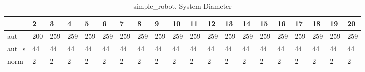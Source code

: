 \begin{table}
\centering
\caption{simple_robot, System Diameter}
\label{simple_robot_diam}
\begin{tabular}{llllllllllllllllllll}
\toprule
{} &    2 &    3 &    4 &    5 &    6 &    7 &    8 &    9 &   10 &   11 &   12 &   13 &   14 &   15 &   16 &   17 &   18 &   19 &   20 \\
\midrule
aut   &  200 &  259 &  259 &  259 &  259 &  259 &  259 &  259 &  259 &  259 &  259 &  259 &  259 &  259 &  259 &  259 &  259 &  259 &  259 \\
aut\_s &   44 &   44 &   44 &   44 &   44 &   44 &   44 &   44 &   44 &   44 &   44 &   44 &   44 &   44 &   44 &   44 &   44 &   44 &   44 \\
norm  &    2 &    2 &    2 &    2 &    2 &    2 &    2 &    2 &    2 &    2 &    2 &    2 &    2 &    2 &    2 &    2 &    2 &    2 &    2 \\
\bottomrule
\end{tabular}
\end{table}
